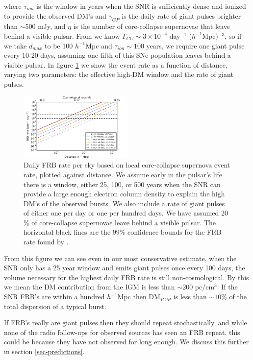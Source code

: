 \documentclass[useAMS,usenatbib]{mn2e}
\begin{document}
\noindent where $\tau_{ion}$ is the window in years when the SNR is sufficiently
dense and ionized to provide the observed DM's and $\gamma_{GP}$
is the daily rate of giant pulses brighter than $\sim 500$ mJy, and $\eta$
is the number of core-collapse supernovae that leave behind a visible pulsar. 
From \cite{2014ApJ...792..135T} we know  
$\Gamma_{CC}\sim3 \times 10^{-4}$ day$^{-1}$ ($h^{-1}$Mpc)$^{-3}$,
so if we take $d_{max}$ to be 100 $h^{-1}$Mpc and $\tau_{ion}\sim100$ years,
we require one giant pulse every 10-20 days, assuming one fifth of this SNe population
leaves behind a visible pulsar.
In figure \ref{FIG-RATE} 
we show the event rate as a function of distance, varying two parameters: the 
effective high-DM window and the rate of giant pulses. 

\begin{figure}
  \centering
   \includegraphics[width=0.5\textwidth]{FRB_SNR_rate.png}
   \caption{Daily FRB rate per sky based on local core-collapse supernova 
   event rate, plotted against distance.
   We assume early in the pulsar's life there is a window, either 
   25, 100, or 500 years when the SNR can provide a large enough electron 
   column density to explain the high DM's of the observed bursts. We also
   include a rate of giant pulses of either one per day or one per hundred
   days. We have assumed 20$\%$ of core-collapse supernovae leave behind
   a visible pulsar.
   The horizontal black lines are the $99\%$ confidence bounds for the FRB rate
   found by \cite{2015arXiv150500834R}.}
   \label{FIG-RATE}
\end{figure}

From this figure we can see even in our most conservative estimate, when
the SNR only has a 25 year window and emits giant pulses once every
100 days, the volume necessary for the highest daily FRB rate is still non-cosmological.
By this we mean the DM contribution from the IGM is less than $\sim 200$ pc/cm$^3$.
If the SNR FRB's are within a hundred $h^{-1}$Mpc then DM$_{IGM}$ is less than 
$\sim 10 \%$  of the total dispersion of a typical burst.

If FRB's really are giant pulses then they 
should repeat stochastically, and while none of the radio follow-ups for
observed sources has seen an FRB repeat, this could be because they
have not observed for long enough. We discuss this further in section 
\ref{sec-predictions}.
\end{document}
